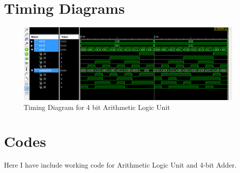\documentclass[12pt]{article}
\begin{document}
\section{Timing Diagrams}
\begin{figure}[!ht]
\centering
\includegraphics[width=1\textwidth]{Capture}
\caption{Timing Diagram for 4 bit Arithmetic Logic Unit}
\label{fig1}
\end{figure}

\section{Codes}
Here I have include working code for Arithmetic Logic Unit and 4-bit Adder.
\end{document}
